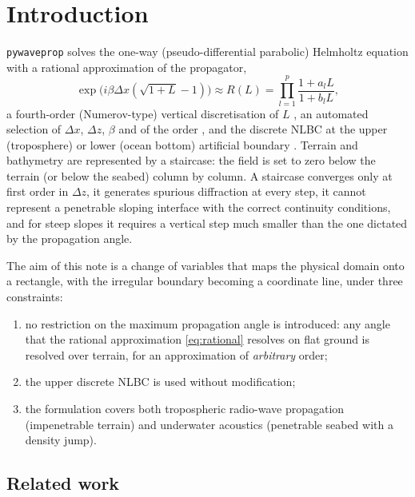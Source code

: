 \documentclass[11pt,a4paper]{article}
\theoremstyle{remark}
\begin{document}
\tableofcontents

\section{Introduction}\label{sec:intro}

\texttt{pywaveprop} solves the one-way (pseudo-differential parabolic) Helmholtz
equation with a rational approximation of the propagator,
\begin{equation}\label{eq:rational}
\exp\!\bigl(i\beta\Delta x(\sqrt{1+L}-1)\bigr)\approx R(L)=\prod_{l=1}^{p}\frac{1+a_lL}{1+b_lL},
\end{equation}
a fourth-order (Numerov-type) vertical discretisation of $L$
\cite{lytaev2020awpl}, an automated selection of $\Delta x$, $\Delta z$, $\beta$ and
of the order \cite{lytaev2020iccsa,lytaev2023jmse,lytaev2026nmp}, and the
discrete NLBC at the upper (troposphere) or lower (ocean bottom) artificial
boundary \cite{lytaev2018awpl}. Terrain and bathymetry are represented by a
staircase: the field is set to zero below the terrain (or below the seabed)
column by column. A staircase converges only at first order in $\Delta z$, it
generates spurious diffraction at every step, it cannot represent a
penetrable sloping interface with the correct continuity conditions, and for
steep slopes it requires a vertical step much smaller than the one dictated by
the propagation angle.

The aim of this note is a change of variables that maps the physical domain
onto a rectangle, with the irregular boundary becoming a coordinate line, under
three constraints:
\begin{enumerate}
\item no restriction on the maximum propagation angle is introduced: any angle
that the rational approximation \eqref{eq:rational} resolves on flat ground is
resolved over terrain, for an approximation of \emph{arbitrary} order;
\item the upper discrete NLBC is used without modification;
\item the formulation covers both tropospheric radio-wave propagation
(impenetrable terrain) and underwater acoustics (penetrable seabed with a
density jump).
\end{enumerate}

\subsection{Related work}\label{sec:review}
\end{document}

